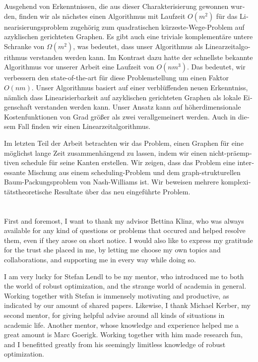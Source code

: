\documentclass[twoside,openright,bibliography=totoc]{scrreprt}
\begin{document}
\begin{otherlanguage}{ngerman}
Ausgehend von Erkenntnissen, die aus dieser Charakterisierung gewonnen wurden, finden wir als nächstes einen Algorithmus mit Laufzeit $O(m^2)$ für das Linearisierungsproblem zugehörig zum quadratischen kürzeste-Wege-Problem auf azyklischen gerichteten Graphen. 
Es gibt auch eine triviale komplementäre untere Schranke von $\Omega(m^2)$, was bedeutet, dass unser Algorithmus als Linearzeitalgorithmus verstanden werden kann.
Im Kontrast dazu hatte der schnellste bekannte Algorithmus vor unserer Arbeit eine Laufzeit von $O(nm^3)$. 
Das bedeutet, wir verbessern den state-of-the-art für diese Problemstellung um einen Faktor $O(nm)$. 
Unser Algorithmus basiert auf einer verblüffenden neuen Erkenntniss, nämlich dass Linearisierbarkeit auf azyklischen gerichteten Graphen als lokale Eigenschaft verstanden werden kann.
Unser Ansatz kann auf höherdimensionale Kostenfunktionen von Grad größer als zwei verallgemeinert werden. Auch in diesem Fall finden wir einen Linearzeitalgorithmus.


Im letzten Teil der Arbeit betrachten wir das Problem, einen Graphen für eine möglichst lange Zeit zusammenhängend zu lassen, indem wir einen nicht-präemptiven schedule für seine Kanten erstellen. Wir zeigen, dass das Problem eine interessante Mischung aus einem scheduling-Problem und dem graph-strukturellen Baum-Packungsproblem von Nash-Williams ist. Wir beweisen mehrere komplexitätstheoretische Resultate über das neu eingeführte Problem.


\end{otherlanguage}




\cleardoublepage

\chapter*{}

First and foremost, I want to thank my advisor Bettina Klinz, who was always available for any kind of questions or problems that occured and helped resolve them, even if they arose on short notice. I would also like to express my gratitude for the trust she placed in me, by letting me choose my own topics and collaborations, and supporting me in every way while doing so.

I am very lucky for Stefan Lendl to be my mentor, who introduced me to both the world of robust optimization, and the strange world of academia in general. Working together with Stefan is immensely motivating and productive, as indicated by our amount of shared papers. 
Likewise, I thank Michael Kerber, my second mentor, for giving helpful advise around all kinds of situations in academic life. 
Another mentor, whose knowledge and experience helped me a great amount is Marc Goerigk. Working together with him made research fun, and I benefitted greatly from his seemingly limitless knowledge of robust optimization.
\end{document}
